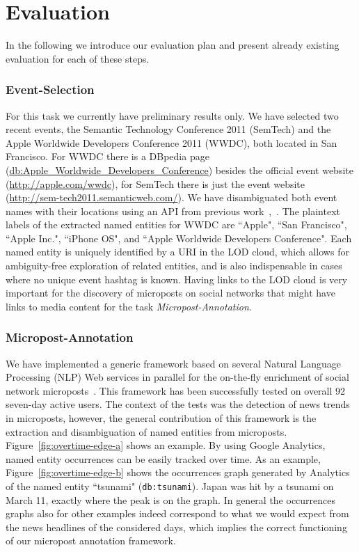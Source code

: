 \documentclass[runningheads,a4paper]{llncs}
\begin{document}
\section{Evaluation}
In the following we introduce our evaluation plan and present already existing evaluation for each of these steps.

\subsubsection{Event-Selection}
For this task we currently have preliminary results only. We have selected two recent events, the Semantic Technology Conference 2011 (SemTech) and the Apple Worldwide Developers Conference 2011 (WWDC), both located in San Francisco. For WWDC there is a DBpedia page (\url{db:Apple_Worldwide_Developers_Conference}) besides the official event website (\url{http://apple.com/wwdc}), for SemTech there is just the event website (\url{http://sem-tech2011.semanticweb.com/}). We have disambiguated both event names with their locations using an API from previous work~\cite{semwebvid},~\cite{twittertrends}. The plaintext labels of the extracted named entities for WWDC are ``Apple", ``San Francisco", ``Apple Inc.", ``iPhone OS", and ``Apple Worldwide Developers Conference". Each named entity is uniquely identified by a URI in the LOD cloud, which allows for ambiguity-free exploration of related entities, and is also indispensable in cases where no unique event hashtag is known. Having links to the LOD cloud is very important for the discovery of microposts on social networks that might have links to media content for the task \emph{Micropost-Annotation}.

\subsubsection{Micropost-Annotation}
We have implemented a generic framework based on several Natural Language Processing (NLP) Web services in parallel for the on-the-fly enrichment of social network microposts~\cite{twittertrends}. This framework has been successfully tested on overall 92 seven-day active users. The context of the tests was the detection of news trends in microposts, however, the general contribution of this framework is the extraction and disambiguation of named entities from microposts. Figure~\ref{fig:overtime-edge-a} shows an example. By using Google Analytics, named entity occurrences can be easily tracked over time. As an example, Figure~\ref{fig:overtime-edge-b} shows the occurrences graph generated by Analytics of the named entity ``tsunami" (\texttt{db:tsunami}). Japan was hit by a tsunami on March 11, exactly where the peak is on the graph. In general the occurrences graphs also for other examples indeed correspond to what we would expect from the news headlines of the considered days, which implies the correct functioning of our micropost annotation framework.
\end{document}
